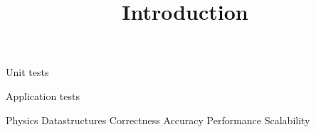 \documentclass{book}
\begin{document}

\title{Introduction} \label{s:intro}

Unit tests

Application tests

Physics
Datastructures
Correctness
Accuracy
Performance
Scalability
\end{document}
